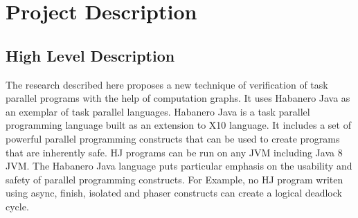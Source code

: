 \section{Project Description}
\subsection{High Level Description}
The research described here proposes a new technique of verification of task parallel programs with the help of computation graphs. It uses Habanero Java as an exemplar of task parallel languages. Habanero Java is a task parallel programming language built as an extension to X10 language. It includes a set of powerful parallel programming constructs that can be used to create programs that are inherently safe. HJ programs can be run on any JVM including Java 8 JVM.  The Habanero Java language puts particular emphasis on the usability and safety of parallel programming constructs. For Example, no HJ program writen using async, finish, isolated and phaser constructs can create a logical deadlock cycle.
